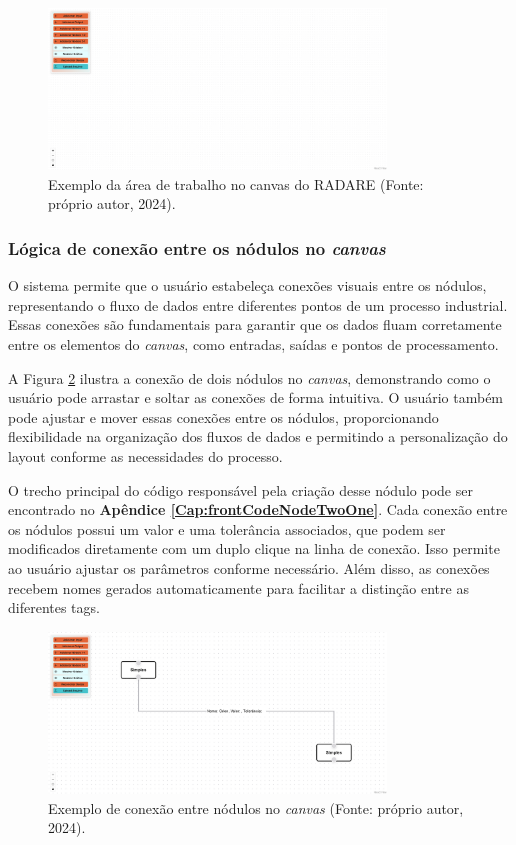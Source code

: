 \begin{figure}[htbp]
    \centering
    \includegraphics[width=0.8\textwidth]{figuras/empty-canvas.png}
    \caption{Exemplo da área de trabalho no canvas do RADARE (Fonte: próprio autor, 2024).}
    \label{Fig:CanvasArea}
\end{figure}

\subsubsection{Lógica de conexão entre os nódulos no \textit{canvas}}

O sistema permite que o usuário estabeleça conexões visuais entre os nódulos, representando o fluxo de dados entre diferentes pontos de um processo industrial. Essas conexões são fundamentais para garantir que os dados fluam corretamente entre os elementos do \textit{canvas}, como entradas, saídas e pontos de processamento.

A Figura \ref{Fig:NodeConnections} ilustra a conexão de dois nódulos no \textit{canvas}, demonstrando como o usuário pode arrastar e soltar as conexões de forma intuitiva. O usuário também pode ajustar e mover essas conexões entre os nódulos, proporcionando flexibilidade na organização dos fluxos de dados e permitindo a personalização do layout conforme as necessidades do processo.

O trecho principal do código responsável pela criação desse nódulo pode ser encontrado no \textbf{Apêndice \ref{Cap:frontCodeNodeTwoOne}}. Cada conexão entre os nódulos possui um valor e uma tolerância associados, que podem ser modificados diretamente com um duplo clique na linha de conexão. Isso permite ao usuário ajustar os parâmetros conforme necessário. Além disso, as conexões recebem nomes gerados automaticamente para facilitar a distinção entre as diferentes tags.

\begin{figure}[htbp]
    \centering
    \includegraphics[width=0.8\textwidth]{figuras/node-connection-example.png}
    \caption{Exemplo de conexão entre nódulos no \textit{canvas} (Fonte: próprio autor, 2024).}
    \label{Fig:NodeConnections}
\end{figure}


